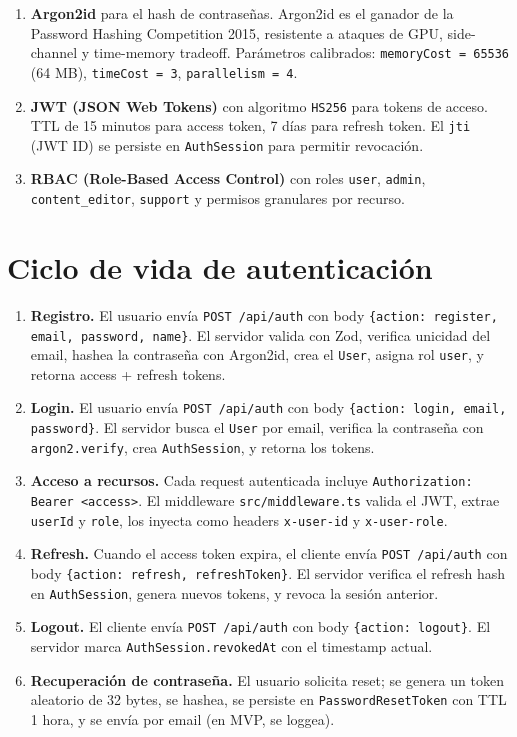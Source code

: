 \documentclass[10pt,a4paper,oneside]{report}
\begin{document}
\begin{enumerate}[leftmargin=1.6em]
\item \textbf{Argon2id} para el hash de contraseñas. Argon2id es el ganador de la Password Hashing Competition 2015, resistente a ataques de GPU, side-channel y time-memory tradeoff. Parámetros calibrados: \texttt{memoryCost = 65536} (64 MB), \texttt{timeCost = 3}, \texttt{parallelism = 4}.
\item \textbf{JWT (JSON Web Tokens)} con algoritmo \texttt{HS256} para tokens de acceso. TTL de 15 minutos para access token, 7 días para refresh token. El \texttt{jti} (JWT ID) se persiste en \texttt{AuthSession} para permitir revocación.
\item \textbf{RBAC (Role-Based Access Control)} con roles \texttt{user}, \texttt{admin}, \texttt{content\_editor}, \texttt{support} y permisos granulares por recurso.
\end{enumerate}

\section{Ciclo de vida de autenticación}

\begin{enumerate}[leftmargin=1.6em]
\item \textbf{Registro.} El usuario envía \texttt{POST /api/auth} con body \texttt{\{action: register, email, password, name\}}. El servidor valida con Zod, verifica unicidad del email, hashea la contraseña con Argon2id, crea el \texttt{User}, asigna rol \texttt{user}, y retorna access + refresh tokens.
\item \textbf{Login.} El usuario envía \texttt{POST /api/auth} con body \texttt{\{action: login, email, password\}}. El servidor busca el \texttt{User} por email, verifica la contraseña con \texttt{argon2.verify}, crea \texttt{AuthSession}, y retorna los tokens.
\item \textbf{Acceso a recursos.} Cada request autenticada incluye \texttt{Authorization: Bearer <access>}. El middleware \texttt{src/middleware.ts} valida el JWT, extrae \texttt{userId} y \texttt{role}, los inyecta como headers \texttt{x-user-id} y \texttt{x-user-role}.
\item \textbf{Refresh.} Cuando el access token expira, el cliente envía \texttt{POST /api/auth} con body \texttt{\{action: refresh, refreshToken\}}. El servidor verifica el refresh hash en \texttt{AuthSession}, genera nuevos tokens, y revoca la sesión anterior.
\item \textbf{Logout.} El cliente envía \texttt{POST /api/auth} con body \texttt{\{action: logout\}}. El servidor marca \texttt{AuthSession.revokedAt} con el timestamp actual.
\item \textbf{Recuperación de contraseña.} El usuario solicita reset; se genera un token aleatorio de 32 bytes, se hashea, se persiste en \texttt{PasswordResetToken} con TTL 1 hora, y se envía por email (en MVP, se loggea).
\end{enumerate}
\end{document}
